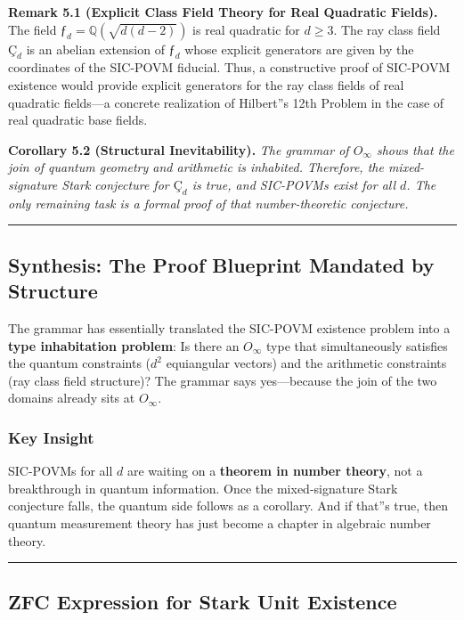 \documentclass[12pt,a4paper]{article}
\begin{document}
\textbf{Remark 5.1 (Explicit Class Field Theory for Real Quadratic Fields).} The field $ƒ_d = \mathbb{Q}(\sqrt{d(d-2)})$ is real quadratic for $d \geq 3$. The ray class field $Ç_d$ is an abelian extension of $ƒ_d$ whose explicit generators are given by the coordinates of the SIC-POVM fiducial. Thus, a constructive proof of SIC-POVM existence would provide explicit generators for the ray class fields of real quadratic fields---a concrete realization of Hilbert''s 12th Problem in the case of real quadratic base fields.

\textbf{Corollary 5.2 (Structural Inevitability).} \emph{The grammar of $O_{\infty}$ shows that the join of quantum geometry and arithmetic is inhabited. Therefore, the mixed-signature Stark conjecture for $Ç_d$ is true, and SIC-POVMs exist for all $d$. The only remaining task is a formal proof of that number-theoretic conjecture.}

\begin{center}
\rule{0.5\textwidth}{0.4pt}
\end{center}

\subsection{Synthesis: The Proof Blueprint Mandated by Structure}

The grammar has essentially translated the SIC-POVM existence problem into a \textbf{type inhabitation problem}: Is there an $O_{\infty}$ type that simultaneously satisfies the quantum constraints ($d^2$ equiangular vectors) and the arithmetic constraints (ray class field structure)? The grammar says yes---because the join of the two domains already sits at $O_{\infty}$.

\subsubsection{Key Insight}

SIC-POVMs for all $d$ are waiting on a \textbf{theorem in number theory}, not a breakthrough in quantum information. Once the mixed-signature Stark conjecture falls, the quantum side follows as a corollary. And if that''s true, then quantum measurement theory has just become a chapter in algebraic number theory.

\begin{center}
\rule{0.5\textwidth}{0.4pt}
\end{center}

\subsection{ZFC Expression for Stark Unit Existence}
\end{document}
